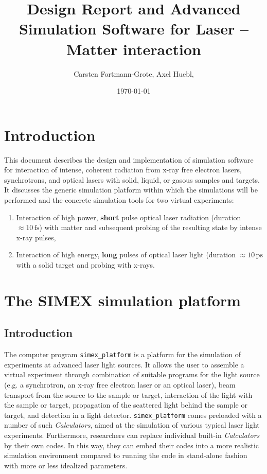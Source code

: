\documentclass[a4paper]{article}
\title{Design Report and Advanced Simulation Software for Laser -- Matter interaction}
\author{Carsten Fortmann-Grote, Axel Huebl, } %
\date{\today}
\begin{document}
\maketitle
\section{Introduction}
This document describes the design and implementation of simulation software for interaction of intense, coherent radiation from x-ray free
electron lasers, synchrotrons, and optical lasers with solid, liquid, or gasous samples and targets.
It discusses the generic simulation platform within which the simulations will be performed and the
concrete simulation tools for two virtual experiments:
\begin{enumerate}
  \item Interaction of high power, \textbf{short} pulse optical laser radiation (duration $\approx 10\,\text{fs}$)
    with matter and subsequent probing of the resulting state by intense x-ray pulses,
  \item Interaction of high energy, \textbf{long} pulses of optical laser light (duration $\approx 10\,\text{ps}$
    with a solid target and probing with x-rays.
\end{enumerate}%

\section{The SIMEX simulation platform \label{sec:simex_platform}}
%
\subsection{Introduction}
The computer program \texttt{simex\_platform} \cite{simex_github} is a platform for the simulation of experiments at advanced laser light sources. It allows the
user to assemble a virtual experiment through combination of suitable programs for the light source (e.g. a synchrotron, an x-ray free electron
laser or an optical laser), beam transport from the source to the sample or target, interaction of the light with the sample or target,
propagation of the scattered light behind the sample or target, and detection in a light detector. \texttt{simex\_platform} comes preloaded with
a number of such \textit{Calculators}, aimed at the simulation of various typical laser light experiments. Furthermore, researchers
can replace individual built-in \textit{Calculators} by their own codes. In this way, they can embed their codes
into a more realistic simulation environment compared to running the code in stand-alone fashion with more or less idealized parameters.
%
\end{document}
